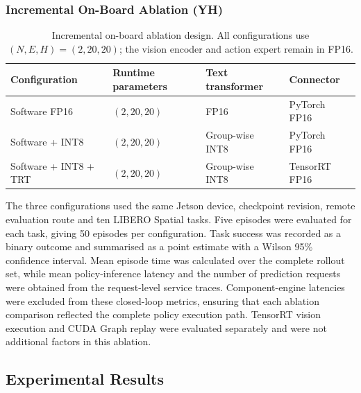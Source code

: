 
\subsubsection{Incremental On-Board Ablation (YH)}

\begin{table}
  \centering
  \caption{Incremental on-board ablation design. All configurations use
  \((N,E,H)=(2,20,20)\); the vision encoder and action expert remain in FP16.}
  \label{tab:onboard_ablation_design}
  \small
  \setlength{\tabcolsep}{4pt}
  \begin{tabular}{@{}p{}p{}p{}p{}@{}}
    \toprule
    Configuration & Runtime parameters & Text transformer & Connector \\
    \midrule
    Software FP16 & \((2,20,20)\) & FP16 & PyTorch FP16 \\
    Software + INT8 & \((2,20,20)\) & Group-wise INT8 & PyTorch FP16 \\
    Software + INT8 + TRT & \((2,20,20)\) & Group-wise INT8 & TensorRT FP16 \\
    \bottomrule
  \end{tabular}
\end{table}

The three configurations used the same Jetson device, checkpoint revision,
remote evaluation route and ten LIBERO Spatial tasks. Five episodes were
evaluated for each task, giving 50 episodes per configuration. Task success was
recorded as a binary outcome and summarised as a point estimate with a Wilson
95\% confidence interval. Mean episode time was calculated over the complete
rollout set, while mean policy-inference latency and the number of prediction
requests were obtained from the request-level service traces. Component-engine
latencies were excluded from these closed-loop metrics, ensuring that each
ablation comparison reflected the complete policy execution path. TensorRT
vision execution and CUDA Graph replay were evaluated separately and were not
additional factors in this ablation.



\subsection{Experimental Results}

